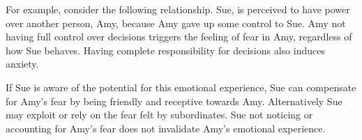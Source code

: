 For example, consider the following relationship. Sue, is perceived to have power over another person, Amy, because Amy gave up some control to Sue. Amy not having full control over decisions triggers the feeling of fear in Amy, regardless of how Sue behaves. Having complete responsibility for decisions also induces anxiety.

If Sue is aware of the potential for this emotional experience, Sue can compensate for Amy's fear by being friendly and receptive towards Amy. Alternatively Sue may exploit or rely on the fear felt by subordinates. Sue not noticing or accounting for Amy's fear does not invalidate Amy's emotional experience.





